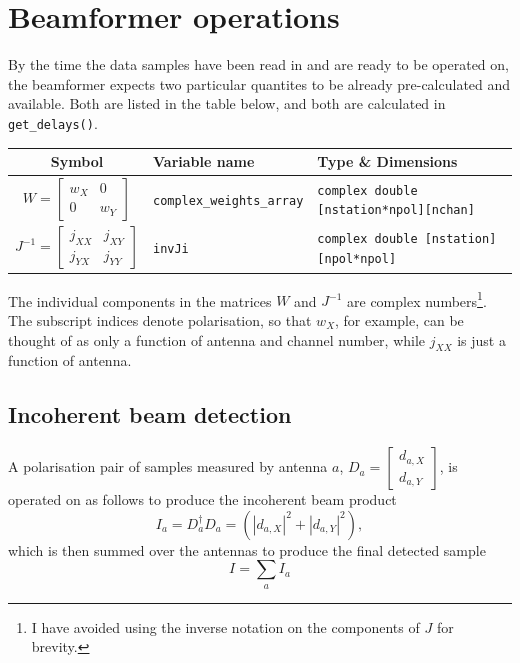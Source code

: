 \documentclass{article}
\begin{document}
\section{Beamformer operations}

By the time the data samples have been read in and are ready to be operated on, the beamformer expects two particular quantites to be already pre-calculated and available.
Both are listed in the table below, and both are calculated in \texttt{get\_delays()}.
\begin{table}[!h]
    \centering
    \begin{tabular}{c|l|l}
        Symbol & Variable name & Type \& Dimensions \\[5pt]
        \hline
        $W = \begin{bmatrix} w_X & 0 \\ 0 & w_Y \end{bmatrix}$ & \texttt{complex\_weights\_array} & \texttt{complex double [nstation*npol][nchan]} \\[12pt]
        $J^{-1} = \begin{bmatrix} j_{XX} & j_{XY} \\ j_{YX} & j_{YY} \end{bmatrix}$ & \texttt{invJi} & \texttt{complex double [nstation][npol*npol]}
    \end{tabular}
\end{table}
The individual components in the matrices $W$ and $J^{-1}$ are complex numbers\footnote{I have avoided using the inverse notation on the components of $J$ for brevity.}. The subscript indices denote polarisation, so that $w_X$, for example, can be thought of as only a function of antenna and channel number, while $j_{XX}$ is just a function of antenna.

\subsection{Incoherent beam detection}
A polarisation pair of samples measured by antenna $a$, $D_a = \begin{bmatrix} d_{a,X} \\ d_{a,Y} \end{bmatrix}$, is operated on as follows to produce the incoherent beam product
\begin{equation}
    I_a = D_a^\dagger D_a = (|d_{a,X}|^2 + |d_{a,Y}|^2),
\end{equation}
which is then summed over the antennas to produce the final detected sample
\begin{equation}
    I = \sum_a I_a
\end{equation}
\end{document}
